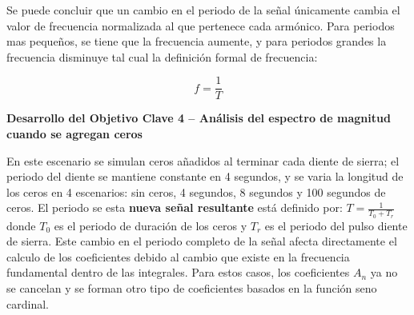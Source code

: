 \documentclass[11pt,a4paper,twocolumn]{article}
\begin{document}
    Se puede concluir que un cambio en el periodo de la señal únicamente cambia el valor de 
    frecuencia normalizada al que pertenece cada armónico. Para periodos mas pequeños, se 
    tiene que la frecuencia aumente, y para periodos grandes la frecuencia disminuye tal cual 
    la definición formal de frecuencia:
    
    \begin{equation}
        f=\frac{1}{T}
    \end{equation}

     \textbf{Desarrollo del Objetivo Clave 4 -- Análisis del espectro de magnitud cuando se agregan ceros}

     En este escenario se simulan ceros añadidos al terminar cada diente de sierra; el periodo del 
     diente se mantiene constante en 4 segundos, y se varia la longitud de los ceros en 4 escenarios: sin 
     ceros, 4 segundos, 8 segundos y 100 segundos de ceros. El periodo se esta \textbf{nueva señal resultante}
     está definido por: $T=\frac{1}{T_0+T_r}$ donde $T_0$ es el periodo de duración de los ceros y $T_r$ es el periodo 
     del pulso diente de sierra. Este cambio en el periodo completo de la señal afecta directamente el 
     calculo de los coeficientes debido al cambio que existe en la frecuencia fundamental dentro de las 
     integrales. Para estos casos, los coeficientes $A_n$ ya no se cancelan y se forman otro tipo de 
     coeficientes basados en la función seno cardinal.
\end{document}
